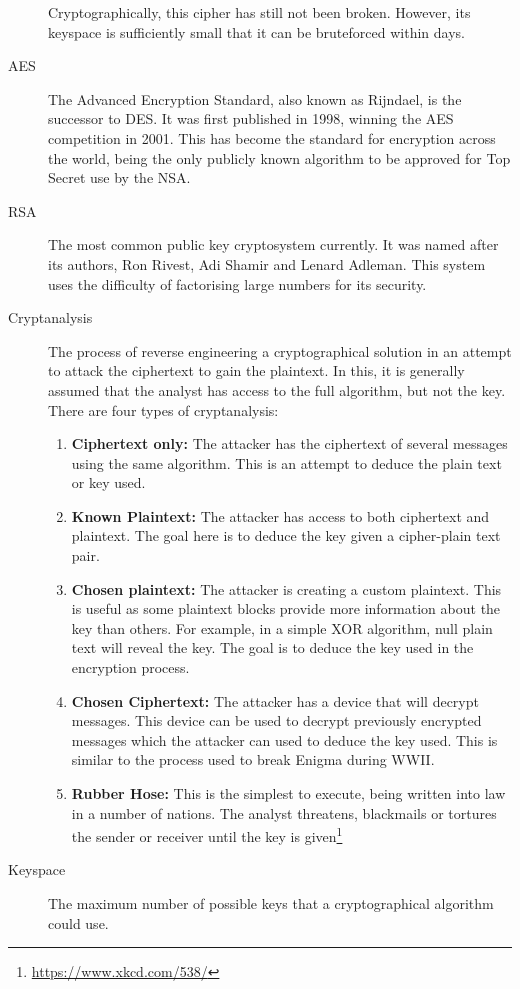 \begin{description}
					Cryptographically, this cipher has still not been broken. 
					However, its keyspace is sufficiently small that it can be bruteforced within days. 
				\item[AES] The Advanced Encryption Standard, also known as Rijndael, is the successor to DES. 
					It was first published in 1998, winning the AES competition in 2001. 
					This has become the standard for encryption across the world, being the only publicly known algorithm to be approved for Top Secret use by the NSA. 
				\item[RSA] The most common public key cryptosystem currently. 
					It was named after its authors, Ron Rivest, Adi Shamir and Lenard Adleman. 
					This system uses the difficulty of factorising large numbers for its security.
				\item[Cryptanalysis] The process of reverse engineering a cryptographical solution in an attempt to attack the ciphertext to gain the plaintext. 
					In this, it is generally assumed that the analyst has access to the full algorithm, but not the key. 
					There are four types of cryptanalysis: 
					\begin{enumerate}
						\item \textbf{Ciphertext only:} The attacker has the ciphertext of several messages using the same algorithm. 
							This is an attempt to deduce the plain text or key used. 
						\item \textbf{Known Plaintext:} The attacker has access to both ciphertext and plaintext. 
							The goal here is to deduce the key given a cipher-plain text pair. 
						\item \textbf{Chosen plaintext:} The attacker is creating a custom plaintext. 
							This is useful as some plaintext blocks provide more information about the key than others. 
							For example, in a simple XOR algorithm, null plain text will reveal the key. 
							The goal is to deduce the key used in the encryption process. 
						\item \textbf{Chosen Ciphertext:} The attacker has a device that will decrypt messages. 
							This device can be used to decrypt previously encrypted messages which the attacker can used to deduce the key used. 
							This is similar to the process used to break Enigma during WWII. 
						\item \textbf{Rubber Hose:} This is the simplest to execute, being written into law in a number of nations.
							The analyst threatens, blackmails or tortures the sender or receiver until the key is given\footnote{\url{https://www.xkcd.com/538/}}
					\end{enumerate}
				\item[Keyspace] The maximum number of possible keys that a cryptographical algorithm could use. 
			\end{description}
